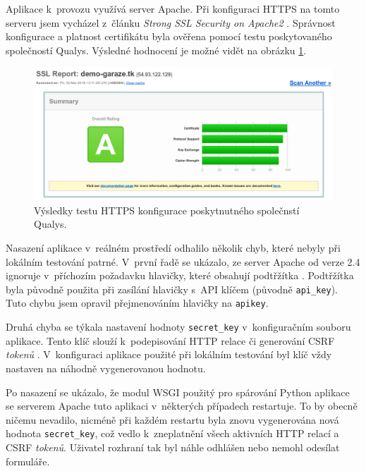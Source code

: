 Aplikace k~provozu využívá server Apache. Při konfiguraci HTTPS na tomto serveru jsem vycházel z~článku \textit{Strong SSL Security on Apache2} \cite{apache_ssl}. Správnost konfigurace a platnost certifikátu byla ověřena pomocí testu poskytovaného společností Qualys. Výsledné hodnocení je možné vidět na obrázku \ref{fig:ssl_test}.

\begin{figure}[h!]
    \centering
    \includegraphics[width=\textwidth]{images/ssl_test.png}
    \caption[Výsledky testu HTTPS konfigurace]{Výsledky testu HTTPS konfigurace poskytnutného společnstí Qualys.}
    \label{fig:ssl_test}
\end{figure}

Nasazení aplikace v~reálném prostředí odhalilo několik chyb, které nebyly při lokálním testování patrné. V~první řadě se ukázalo, ze server Apache od verze 2.4 ignoruje v~příchozím požadavku hlavičky, které obsahují podtřžítka \cite{apache_headers_update}. Podtřžítka byla původně použita při zasílání hlavičky s~API klíčem (původně \texttt{api\_key}). Tuto chybu jsem opravil přejmenováním hlavičky na \texttt{apikey}.

Druhá chyba se týkala nastavení hodnoty \texttt{secret\_key} v~konfiguračním souboru aplikace. Tento klíč slouží k~podepisování HTTP relace či generování CSRF \textit{tokenů} \cite{flask_api}. V~konfiguraci aplikace použité při lokálním testování byl klíč vždy nastaven na náhodně vygenerovanou hodnotu.

Po nasazení se ukázalo, že modul WSGI \cite{python_wsgi} použitý pro spárování Python aplikace se serverem Apache tuto aplikaci v~některých případech restartuje. To by obecně ničemu nevadilo, nicméně při každém restartu byla znovu vygenerována nová hodnota \texttt{secret\_key}, což vedlo k~zneplatnění všech aktivních HTTP relací a CSRF \textit{tokenů}. Uživatel rozhraní tak byl náhle odhlášen nebo nemohl odesílat formuláře. 


